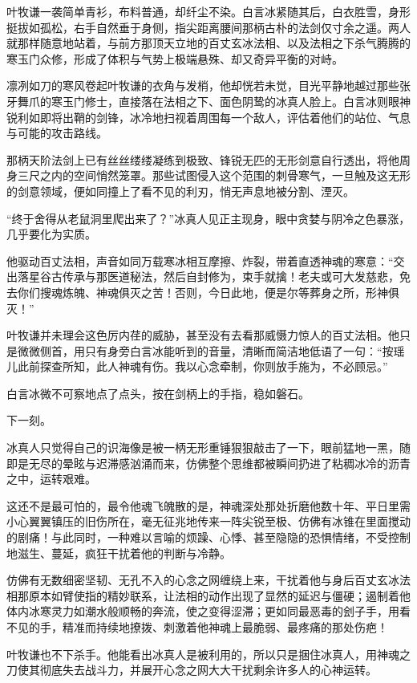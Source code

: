 叶牧谦一袭简单青衫，布料普通，却纤尘不染。白言冰紧随其后，白衣胜雪，身形挺拔如孤松，右手自然垂于身侧，指尖距离腰间那柄古朴的法剑仅寸余之遥。两人就那样随意地站着，与前方那顶天立地的百丈玄冰法相、以及法相之下杀气腾腾的寒玉门众修，形成了体积与气势上极端悬殊、却又奇异平衡的对峙。

凛冽如刀的寒风卷起叶牧谦的衣角与发梢，他却恍若未觉，目光平静地越过那些张牙舞爪的寒玉门修士，直接落在法相之下、面色阴鸷的冰真人脸上。白言冰则眼神锐利如即将出鞘的剑锋，冰冷地扫视着周围每一个敌人，评估着他们的站位、气息与可能的攻击路线。

那柄天阶法剑上已有丝丝缕缕凝练到极致、锋锐无匹的无形剑意自行透出，将他周身三尺之内的空间悄然笼罩。那些试图侵入这个范围的刺骨寒气，一旦触及这无形的剑意领域，便如同撞上了看不见的利刃，悄无声息地被分割、湮灭。

“终于舍得从老鼠洞里爬出来了？”冰真人见正主现身，眼中贪婪与阴冷之色暴涨，几乎要化为实质。

他驱动百丈法相，声音如同万载寒冰相互摩擦、炸裂，带着直透神魂的寒意：“交出落星谷古传承与那医道秘法，然后自封修为，束手就擒！老夫或可大发慈悲，免去你们搜魂炼魄、神魂俱灭之苦！否则，今日此地，便是尔等葬身之所，形神俱灭！”

叶牧谦并未理会这色厉内荏的威胁，甚至没有去看那威慑力惊人的百丈法相。他只是微微侧首，用只有身旁白言冰能听到的音量，清晰而简洁地低语了一句：“按瑶儿此前探查所知，此人神魂有伤。我以心念牵制，你则放手施为，不必顾忌。”

白言冰微不可察地点了点头，按在剑柄上的手指，稳如磐石。

\vspace{2em}

下一刻。

冰真人只觉得自己的识海像是被一柄无形重锤狠狠敲击了一下，眼前猛地一黑，随即是无尽的晕眩与迟滞感汹涌而来，仿佛整个思维都被瞬间扔进了粘稠冰冷的沥青之中，运转艰难。

这还不是最可怕的，最令他魂飞魄散的是，神魂深处那处折磨他数十年、平日里需小心翼翼镇压的旧伤所在，毫无征兆地传来一阵尖锐至极、仿佛有冰锥在里面搅动的剧痛！与此同时，一种难以言喻的烦躁、心悸、甚至隐隐的恐惧情绪，不受控制地滋生、蔓延，疯狂干扰着他的判断与冷静。

仿佛有无数细密坚韧、无孔不入的心念之网缠绕上来，干扰着他与身后百丈玄冰法相那原本如臂使指的精妙联系，让法相的动作出现了显然的延迟与僵硬；遏制着他体内冰寒灵力如潮水般顺畅的奔流，使之变得涩滞；更如同最恶毒的刽子手，用看不见的手，精准而持续地撩拨、刺激着他神魂上最脆弱、最疼痛的那处伤疤！

叶牧谦也不下杀手。他能看出冰真人是被利用的，所以只是捆住冰真人，用神魂之刀使其彻底失去战斗力，并展开心念之网大大干扰剩余许多人的心神运转。

